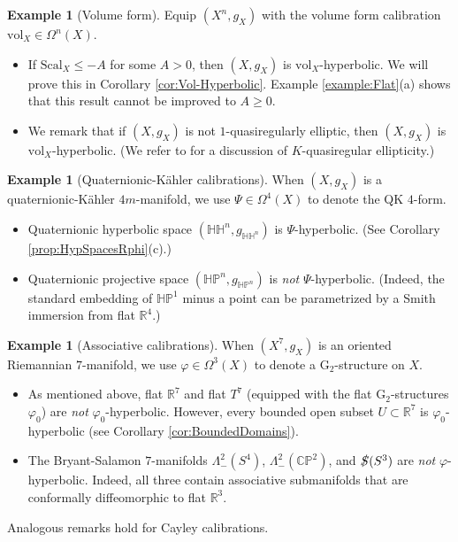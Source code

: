 \documentclass[11pt]{article}
\newcommand{\G}{\mathrm{G}}
\newcommand{\Spinor}{\slashed{S}}
\newcommand{\R}{\mathbb{R}}
\newcommand{\CP}{\mathbb{CP}}
\newcommand{\vol}{\mathrm{vol}}
\theoremstyle{definition}
\newtheorem{example}[thm]{Example}
\numberwithin{equation}{section}
\begin{document}
\begin{example}[Volume form] Equip $(X^n, g_X)$ with the volume form calibration $\vol_X \in \Omega^n(X)$.
\begin{itemize}
\item If $\mathrm{Scal}_X \leq -A$ for some $A > 0$, then $(X, g_X)$ is $\mathrm{vol}_X$-hyperbolic.  We will prove this in Corollary \ref{cor:Vol-Hyperbolic}. Example \ref{example:Flat}(a) shows that this result cannot be improved to $A \geq 0$.
\item We remark that if $(X, g_X)$ is not $1$-quasiregularly elliptic, then $(X, g_X)$ is $\vol_X$-hyperbolic.  (We refer to \cite{bonk2001quasiregular} for a discussion of $K$-quasiregular ellipticity.)
\end{itemize}
\end{example}

\begin{example}[Quaternionic-K\"{a}hler calibrations] When $(X,g_X)$ is a quaternionic-K\"{a}hler $4m$-manifold, we use $\Psi \in \Omega^4(X)$ to denote the QK $4$-form.
\begin{itemize}
\item Quaternionic hyperbolic space $(\mathbb{HH}^n, g_{\mathbb{HH}^n})$ is $\Psi$-hyperbolic.  (See Corollary \ref{prop:HypSpacesRphi}(c).)
\item Quaternionic projective space $(\mathbb{HP}^n, g_{\mathbb{HP}^n})$ is \emph{not} $\Psi$-hyperbolic.  (Indeed, the standard embedding of $\mathbb{HP}^1$ minus a point can be parametrized by a Smith immersion from flat $\R^4$.)
\end{itemize}
\end{example}

\begin{example}[Associative calibrations] When $(X^7, g_X)$ is an oriented Riemannian $7$-manifold, we use $\varphi \in \Omega^3(X)$ to denote a $\G_2$-structure on $X$.
\begin{itemize}
\item As mentioned above, flat $\R^7$ and flat $T^7$ (equipped with the flat $\G_2$-structures $\varphi_0$) are \emph{not} $\varphi_0$-hyperbolic. However, every bounded open subset $U \subset \R^7$ is $\varphi_0$-hyperbolic (see Corollary \ref{cor:BoundedDomains}).
\item The Bryant-Salamon $7$-manifolds $\Lambda^2_-(S^4)$, $\Lambda^2_-(\CP^2)$, and $\Spinor(S^3)$ are \emph{not} $\varphi$-hyperbolic.  Indeed, all three contain associative submanifolds that are conformally diffeomorphic to flat $\R^3$.
\end{itemize}
Analogous remarks hold for Cayley calibrations.
\end{example}
\end{document}
